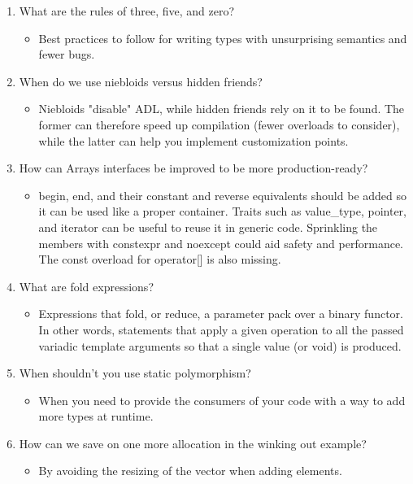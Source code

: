 \begin{enumerate}
\item
What are the rules of three, five, and zero?
\begin{itemize}
\item 
Best practices to follow for writing types with unsurprising semantics and fewer bugs.
\end{itemize}

\item
When do we use niebloids versus hidden friends?
\begin{itemize}
\item 
Niebloids "disable" ADL, while hidden friends rely on it to be found. The former can therefore speed up compilation (fewer overloads to consider), while the latter can help you implement customization points.
\end{itemize}

\item
How can Arrays interfaces be improved to be more production-ready?
\begin{itemize}
\item 
begin, end, and their constant and reverse equivalents should be added so it can be used like a proper container. Traits such as value\_type, pointer, and iterator can be useful to reuse it in generic code. Sprinkling the members with constexpr and noexcept could aid safety and performance. The const overload for operator[] is also missing.
\end{itemize}

\item
What are fold expressions?
\begin{itemize}
\item 
Expressions that fold, or reduce, a parameter pack over a binary functor. In other words, statements that apply a given operation to all the passed variadic template arguments so that a single value (or void) is produced.
\end{itemize}

\item
When shouldn't you use static polymorphism?
\begin{itemize}
\item 
When you need to provide the consumers of your code with a way to add more types at runtime.
\end{itemize}

\item
How can we save on one more allocation in the winking out example?
\begin{itemize}
\item 
By avoiding the resizing of the vector when adding elements.
\end{itemize}
\end{enumerate}